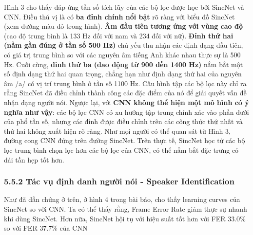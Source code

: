 \documentclass{article}
\begin{document}
	Hình 3 cho thấy đáp ứng tần số tích lũy của các bộ lọc được học bởi SincNet và CNN. Điều thú vị là có \textbf{ba đỉnh chính nổi bật} rõ ràng với biểu đồ SincNet (xem đường màu đỏ trong hình). \textbf{Âm đầu tiên tương ứng với vùng cao độ} (cao độ trung bình là 133 Hz đối với nam và 234 đối với nữ). \textbf{Đỉnh thứ hai (nằm gần đúng ở tần số 500 Hz)} chủ yếu thu nhận các định dạng đầu tiên, có giá trị trung bình so với các nguyên âm tiếng Anh khác nhau thực sự là 500 Hz. Cuối cùng, \textbf{đỉnh thứ ba (dao động từ 900 đến 1400 Hz)} nắm bắt một số định dạng thứ hai quan trọng, chẳng hạn như định dạng thứ hai của nguyên âm /a/ có vị trí trung bình ở tần số 1100 Hz. Cấu hình tập các bộ lọc này chỉ ra rằng SincNet đã điều chỉnh thành công các đặc điểm của nó để giải quyết vấn đề nhận dạng người nói. Ngược lại, với \textbf{CNN không thể hiện một mô hình có ý nghĩa như vậy}: các bộ lọc CNN có xu hướng tập trung chính xác vào phần dưới của phổ tần số, nhưng các đỉnh được điều chỉnh trên các công thức thứ nhất và thứ hai không xuất hiện rõ ràng. Như mọi người có thể quan sát từ Hình 3, đường cong CNN đứng trên đường SincNet. Trên thực tế, SincNet học từ các bộ lọc trung bình chọn lọc hơn các bộ lọc của CNN, có thể nắm bắt đặc trưng có dải tần hẹp tốt hơn.

	\subsubsection{5.5.2 Tác vụ định danh người nói - Speaker Identification}
	\qquad Như đã dẫn chứng ở trên, ở hình 4 trong bài báo, cho thấy learning curves của SincNet so với CNN. Ta có thể thấy rằng, Frame Error Rate giảm thực sự nhanh khi dùng SincNet. Hơn nữa, SincNet hội tụ với hiệu suất tốt hơn với FER $33.0\%$ so với FER $37.7\%$ của CNN
	
\end{document}
